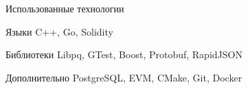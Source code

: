 \documentclass[hyperref={pdfpagelabels=false}]{beamer}
\begin{document}
\begin{frame}{Использованные технологии}
\begin{block}{Языки}
	C++, Go, Solidity
\end{block}
\vfill
\begin{block}{Библиотеки}
	Libpq, GTest, Boost, Protobuf, RapidJSON
\end{block}
\vfill
\begin{block}{Дополнительно}
	PostgreSQL, EVM, CMake, Git, Docker
\end{block}

\end{frame} 
\end{document}
